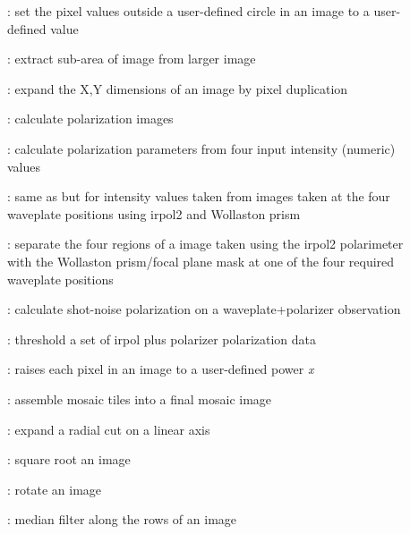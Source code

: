 \begin{description}
\begin{description}
\item []: set the pixel values outside a
user-defined circle in an image to a user-defined value

\item []: extract sub-area of image from larger image

\item []: expand the X,Y dimensions of an
image by pixel duplication

\item []: calculate polarization images

\item []: calculate polarization parameters from
four input intensity (numeric) values

\item []: same as {\bf {}}
but for intensity values taken from images taken at the four waveplate
positions using {\sc irpol2} and Wollaston prism

\item []: separate the four regions of a image
taken using the {\sc irpol2} polarimeter with the Wollaston prism/focal plane
mask at one of the four required waveplate positions

\item []: calculate shot-noise polarization
on a waveplate+polarizer observation

\item []: threshold a set of
{\sc irpol} plus polarizer polarization data

\item []: raises each pixel in an image to a
user-defined power {\it x}

\item []: assemble mosaic tiles into a final mosaic image

\item []: expand a radial cut on a linear axis

\item []: square root an image

\item []: rotate an image

\item []: median filter along the rows of an image


\end{description}
\end{description}
